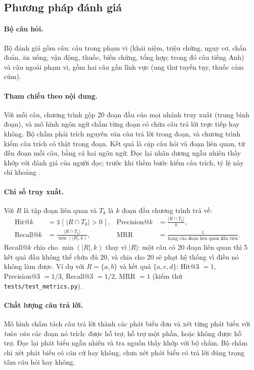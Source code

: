 \documentclass[11pt,a4paper]{article}
\begin{document}
\subsection{Phương pháp đánh giá}
\label{sec:method}

\paragraph{Bộ câu hỏi.}
Bộ đánh giá gồm \nQuestions{} câu: \nInScope{} câu trong phạm vi (khái niệm, triệu chứng, nguy cơ, chẩn đoán, ăn uống,
vận động, thuốc, biến chứng, tổng hợp; trong đó \nQEn{} câu tiếng Anh) và \nOos{} câu ngoài phạm vi, gồm hai câu
gần lĩnh vực (ung thư tuyến tụy, thuốc cảm cúm).

\paragraph{Tham chiếu theo nội dung.}
Với mỗi câu, chương trình gộp 20 đoạn đầu của mọi nhánh truy xuất (trung bình \poolMean{} đoạn), và mô hình ngôn ngữ
chấm từng đoạn có chứa câu trả lời trực tiếp hay không. Bộ chấm phải trích nguyên văn câu trả lời trong đoạn, và
chương trình kiểm câu trích có thật trong đoạn. Kết quả là \nGoldPairs{} cặp câu hỏi và đoạn liên quan, từ \goldMin{}
đến \goldMax{} đoạn mỗi câu, bằng cả hai ngôn ngữ. Đọc lại \relAgree{} nhãn dương ngẫu nhiên thấy khớp với đánh giá
của người đọc; trước khi thêm bước kiểm câu trích, tỷ lệ này chỉ khoảng \relAgreeLenient{}.

\paragraph{Chỉ số truy xuất.}
Với $R$ là tập đoạn liên quan và $T_k$ là $k$ đoạn đầu chương trình trả về:
\begin{align*}
\text{Hit@}k &= \mathbb{1}\!\left[\,|R \cap T_k| > 0\,\right], &
\text{Precision@}k &= \frac{|R \cap T_k|}{k}, \\
\text{Recall@}k &= \frac{|R \cap T_k|}{\min(|R|, k)}, &
\text{MRR} &= \frac{1}{\text{hạng của đoạn liên quan đầu tiên}}.
\end{align*}
Recall@$k$ chia cho $\min(|R|, k)$ thay vì $|R|$: một câu có 20 đoạn liên quan thì 5 kết quả đầu không thể chứa đủ
20, và chia cho 20 sẽ phạt hệ thống vì điều nó không làm được. Ví dụ với $R = \{a, b\}$ và kết quả $\{a, c, d\}$:
Hit@3 $= 1$, Precision@3 $= 1/3$, Recall@3 $= 1/2$, MRR $= 1$ (kiểm thử \texttt{tests/test\_metrics.py}).

\paragraph{Chất lượng câu trả lời.}
Mô hình chấm tách câu trả lời thành các phát biểu đơn và xét từng phát biểu với \emph{toàn văn} các đoạn nó trích:
được hỗ trợ, hỗ trợ một phần, hoặc không được hỗ trợ. Đọc lại \claimAgree{} phát biểu ngẫu nhiên và tra nguồn thấy
khớp với bộ chấm. Bộ chấm chỉ xét phát biểu có căn cứ hay không, chưa xét phát biểu có trả lời đúng trọng tâm câu
hỏi hay không.
\end{document}
